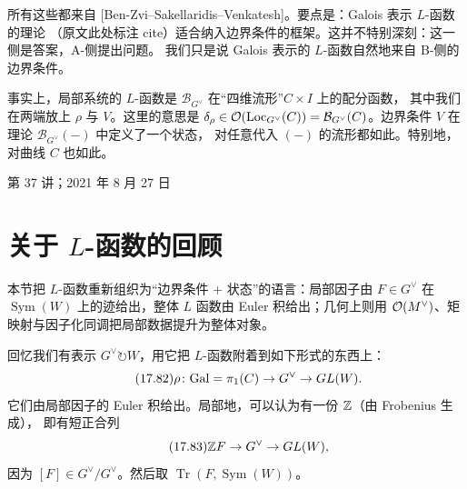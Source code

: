 
所有这些都来自 [Ben-Zvi--Sakellaridis--Venkatesh]。要点是：Galois 表示 $L$-函数的理论
（原文此处标注 cite）适合纳入边界条件的框架。这并不特别深刻：这一侧是答案，A-侧提出问题。
我们只是说 Galois 表示的 $L$-函数自然地来自 B-侧的边界条件。

事实上，局部系统的 $L$-函数是 $\mathcal B_{G^{\vee}}$ 在“四维流形”$C\times I$ 上的配分函数，
其中我们在两端放上 $\rho$ 与 $V$。这里的意思是 $\delta_{\rho}\in\mathcal{O}(\mathrm{Loc}_{G^{\vee}}(C))
=\mathcal B_{G^{\vee}}(C)$。边界条件 $V$ 在理论 $\mathcal B_{G^{\vee}}(-)$ 中定义了一个状态，
对任意代入 $(-)$ 的流形都如此。特别地，对曲线 $C$ 也如此。

\begin{flushright}
\small 第 37 讲；2021 年 8 月 27 日
\end{flushright}

\section{关于 $L$-函数的回顾}

\begin{sectionkey}
本节把 $L$-函数重新组织为“边界条件 + 状态”的语言：局部因子由 $F\in G^{\vee}$ 在
$\operatorname{Sym}(W)$ 上的迹给出，整体 $L$ 函数由 Euler 积给出；几何上则用
$\mathcal{O}(M^{\vee})$、矩映射与因子化同调把局部数据提升为整体对象。
\end{sectionkey}

回忆我们有表示 $G^{\vee}\circlearrowright W$，用它把 $L$-函数附着到如下形式的东西上：
\begin{equation}\tag{17.82}\label{eq:17.82}
\rho\colon\mathrm{Gal}=\pi_1(C)\to G^{\vee}\to GL(W).
\end{equation}
它们由局部因子的 Euler 积给出。局部地，可以认为有一份 $\mathbb{Z}$（由 Frobenius 生成），
即有短正合列
\begin{equation}\tag{17.83}\label{eq:17.83}
\mathbb{Z} F\to G^{\vee}\to GL(W),
\end{equation}
因为 $[F]\in G^{\vee}/G^{\vee}$。然后取 $\operatorname{Tr}(F,\operatorname{Sym}(W))$。

